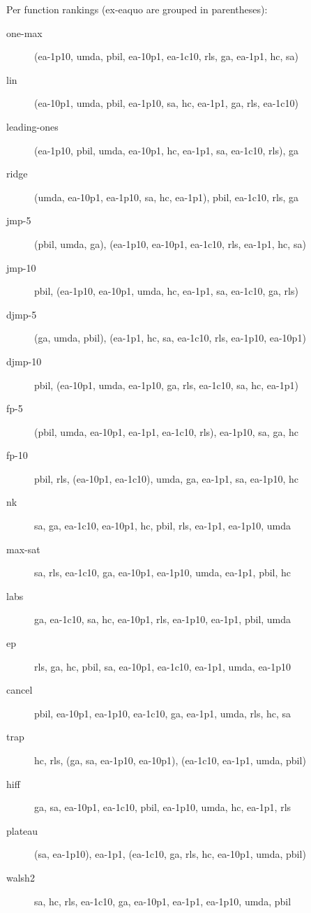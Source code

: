Per function rankings (ex-eaquo are grouped in parentheses):
\begin{description}
\item[one-max]
(ea-1p10, umda, pbil, ea-10p1, ea-1c10, rls, ga, ea-1p1, hc, sa)

\item[lin]
(ea-10p1, umda, pbil, ea-1p10, sa, hc, ea-1p1, ga, rls, ea-1c10)

\item[leading-ones]
(ea-1p10, pbil, umda, ea-10p1, hc, ea-1p1, sa, ea-1c10, rls), ga

\item[ridge]
(umda, ea-10p1, ea-1p10, sa, hc, ea-1p1), pbil, ea-1c10, rls, ga

\item[jmp-5]
(pbil, umda, ga), (ea-1p10, ea-10p1, ea-1c10, rls, ea-1p1, hc, sa)

\item[jmp-10]
pbil, (ea-1p10, ea-10p1, umda, hc, ea-1p1, sa, ea-1c10, ga, rls)

\item[djmp-5]
(ga, umda, pbil), (ea-1p1, hc, sa, ea-1c10, rls, ea-1p10, ea-10p1)

\item[djmp-10]
pbil, (ea-10p1, umda, ea-1p10, ga, rls, ea-1c10, sa, hc, ea-1p1)

\item[fp-5]
(pbil, umda, ea-10p1, ea-1p1, ea-1c10, rls), ea-1p10, sa, ga, hc

\item[fp-10]
pbil, rls, (ea-10p1, ea-1c10), umda, ga, ea-1p1, sa, ea-1p10, hc

\item[nk]
sa, ga, ea-1c10, ea-10p1, hc, pbil, rls, ea-1p1, ea-1p10, umda

\item[max-sat]
sa, rls, ea-1c10, ga, ea-10p1, ea-1p10, umda, ea-1p1, pbil, hc

\item[labs]
ga, ea-1c10, sa, hc, ea-10p1, rls, ea-1p10, ea-1p1, pbil, umda

\item[ep]
rls, ga, hc, pbil, sa, ea-10p1, ea-1c10, ea-1p1, umda, ea-1p10

\item[cancel]
pbil, ea-10p1, ea-1p10, ea-1c10, ga, ea-1p1, umda, rls, hc, sa

\item[trap]
hc, rls, (ga, sa, ea-1p10, ea-10p1), (ea-1c10, ea-1p1, umda, pbil)

\item[hiff]
ga, sa, ea-10p1, ea-1c10, pbil, ea-1p10, umda, hc, ea-1p1, rls

\item[plateau]
(sa, ea-1p10), ea-1p1, (ea-1c10, ga, rls, hc, ea-10p1, umda, pbil)

\item[walsh2]
sa, hc, rls, ea-1c10, ga, ea-10p1, ea-1p1, ea-1p10, umda, pbil

\end{description}
